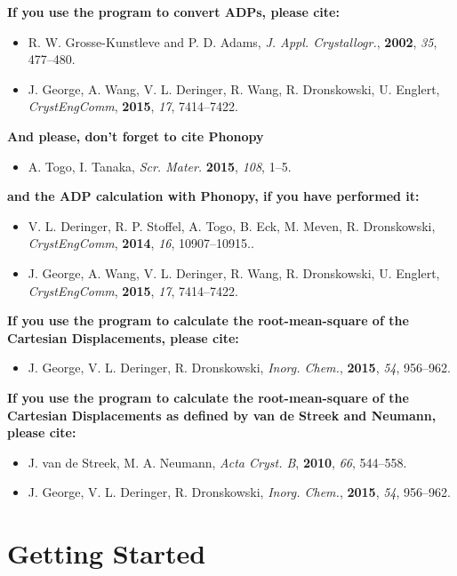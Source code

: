 \documentclass[12pt,a4paper]{article}
\begin{document}
\textbf{If you use the program to convert ADPs, please cite:}
 \begin{itemize}
  \item R. W. Grosse-Kunstleve and P. D. Adams, \textit{J. Appl. Crystallogr.}, \textbf{2002}, \textit{35}, 477–480.
  \item J. George, A. Wang, V. L. Deringer, R. Wang, R. Dronskowski, U. Englert, \textit{CrystEngComm}, \textbf{2015}, \textit{17}, 7414–7422.
 \end{itemize}
\textbf{And please, don't forget to cite Phonopy}
   \begin{itemize}
 \item A. Togo, I. Tanaka, \textit{Scr. Mater.} \textbf{2015}, \textit{108}, 1–5.
 \end{itemize}
\textbf{and the ADP calculation with Phonopy, if you have performed it:}
 \begin{itemize}
 \item V. L. Deringer, R. P. Stoffel, A. Togo, B. Eck, M. Meven, R. Dronskowski, \textit{CrystEngComm}, \textbf{2014}, \textit{16}, 10907–10915..
  \item J. George, A. Wang, V. L. Deringer, R. Wang, R. Dronskowski, U. Englert, \textit{CrystEngComm}, \textbf{2015}, \textit{17}, 7414–7422.
 \end{itemize}
 
\textbf{If you use the program to calculate the root-mean-square of the Cartesian Displacements, please cite:}
 \begin{itemize}
  \item J. George, V. L. Deringer, R. Dronskowski, \textit{Inorg. Chem.}, \textbf{2015}, \textit{54}, 956–962.
 \end{itemize}
\textbf{If you use the program to calculate the root-mean-square of the Cartesian Displacements as defined by van de Streek and Neumann, please cite:}
\begin{itemize}
  \item J. van de Streek, M. A. Neumann,  \textit{Acta Cryst. B}, \textbf{2010}, \textit{66},  544–558.
   \item J. George, V. L. Deringer, R. Dronskowski, \textit{Inorg. Chem.}, \textbf{2015}, \textit{54}, 956–962.
 \end{itemize}
  \newpage


\section{Getting Started}
\end{document}

